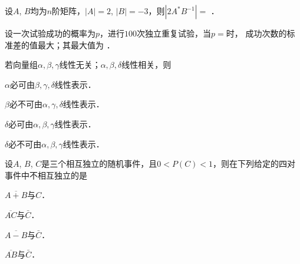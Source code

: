 \documentclass[plain,noanswer,medmath]{../../template/jnuexam}
\begin{document}












\begin{problem}
设$A$, $B$均为$n$阶矩阵，$|A| = 2$, $|B| = - 3$，则$\left| 2A^*B^{-1} \right| =$ \fillin{}．
\end{problem}


\begin{problem}
设一次试验成功的概率为$p$，进行$100$次独立重复试验，当$p=$\fillin{}时，
成功次数的标准差的值最大；其最大值为 \fillin{}．
\end{problem}








\begin{problem}
若向量组$\alpha ,\beta ,\gamma$线性无关；$\alpha ,\beta ,\delta$线性相关，则\pickout{}
\begin{abcd}
\item $\alpha$必可由$\beta ,\gamma ,\delta$线性表示．
\item $\beta$必不可由$\alpha ,\gamma ,\delta$线性表示．
\item $\delta$必可由$\alpha ,\beta ,\gamma$线性表示．
\item $\delta$必不可由$\alpha ,\beta ,\gamma$线性表示．
\end{abcd}
\end{problem}


\begin{problem}
设$A$, $B$, $C$是三个相互独立的随机事件，且$0 < P(C) < 1$，则在下列给定的四对事件中不相互独立的是\pickout{}
\begin{abcd}
\item $\overline{A + B}$与$C$．
\item $\overline{AC}$与$\bar C$．
\item $\overline{A - B}$与$\bar C$．
\item $\overline{AB}$与$\bar C$．
\end{abcd}
\end{problem}
\end{document}
